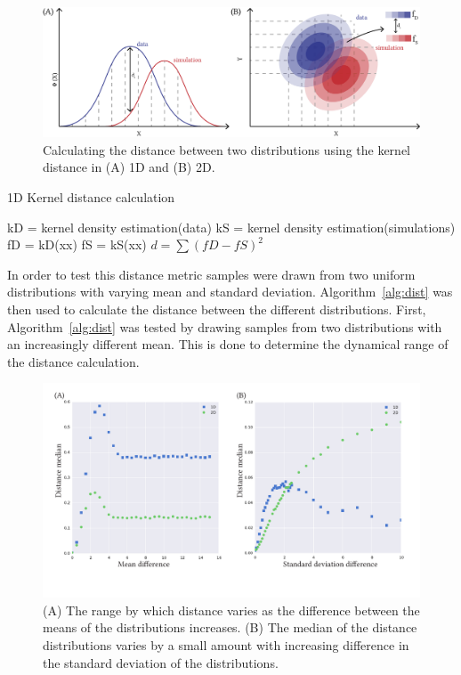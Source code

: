 \begin{figure}[tb]
\centering
\includegraphics[scale=0.8]{../../chapters/chapterABCFlow/images/old_distance.png}
\caption[Kernel distance]{\label{fig:old_dist}Calculating the distance between two distributions using the kernel distance in (A) 1D and (B) 2D. }
\end{figure}



\begin{algorithm}[tb]
\caption{1D Kernel distance calculation}
\label{alg:dist}
 \begin{algorithmic}[1]
    \Statex
	\State kD = kernel density estimation(data)
	\State kS = kernel density estimation(simulations)
	\State fD = kD(xx)
	\State fS = kS(xx)    
	\State $d = \sum(fD-fS)^2$
  \end{algorithmic}
\end{algorithm}

In order to test this distance metric samples were drawn from two uniform distributions with varying mean and standard deviation. Algorithm~\ref{alg:dist} was then used to calculate the distance between the different distributions. First, Algorithm~\ref{alg:dist} was tested by drawing samples from two distributions with an increasingly different mean. This is done to determine the dynamical range of the distance calculation.

\begin{figure}[htb]
\centering
\includegraphics[scale=0.7]{../../chapters/chapterABCFlow/images/mus_sigmas.pdf}
\caption[Range of distance values using the kernel distance]{\label{fig:epsilon_mu_s_diff}(A) The range by which distance varies as the difference between the means of the distributions increases. (B) The median of the distance distributions varies by a small amount with increasing difference in the standard deviation of the distributions.}
\end{figure}


